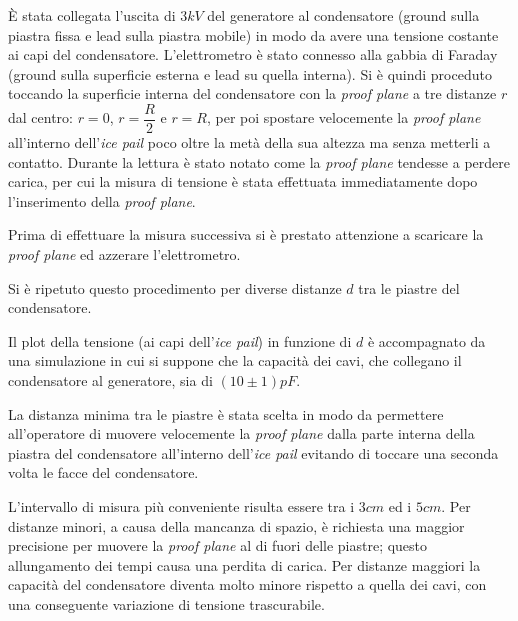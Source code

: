 {\fontsize{12}{14}\selectfont 

È stata collegata l'uscita di $3kV$ del generatore al condensatore (ground sulla piastra fissa e lead sulla piastra mobile) in modo da avere una tensione costante ai capi del condensatore. L'elettrometro è stato connesso alla gabbia di Faraday (ground sulla superficie esterna e lead su quella interna). Si è quindi proceduto toccando la superficie interna del condensatore con la \emph{proof plane} a tre distanze $r$ dal centro: $r = 0$, $r = \dfrac{R}{2}$ e $r = R$, per poi spostare velocemente la \emph{proof plane} all'interno dell'\emph{ice pail} poco oltre la metà della sua altezza ma senza metterli a contatto. Durante la lettura è stato notato come la \emph{proof plane} tendesse a perdere carica, per cui la misura di tensione è stata effettuata immediatamente dopo l'inserimento della \emph{proof plane}.
\par
Prima di effettuare la misura successiva si è prestato attenzione a scaricare la \emph{proof plane} ed azzerare l'elettrometro.
\par
Si è ripetuto questo procedimento per diverse distanze $d$ tra le piastre del condensatore.
\par
Il plot della tensione (ai capi dell'\emph{ice pail}) in funzione di $d$ è accompagnato da una simulazione in cui si suppone che la capacità dei cavi, che collegano il condensatore al generatore, sia di $(10 \pm 1)pF$.

La distanza minima tra le piastre è stata scelta in modo da permettere all'operatore di muovere velocemente la \emph{proof plane} dalla parte interna della piastra del condensatore all'interno dell'\emph{ice pail} evitando di toccare una seconda volta le facce del condensatore. 
\par
L'intervallo di misura più conveniente risulta essere tra i $3cm$ ed i $5cm$. Per distanze minori, a causa della mancanza di spazio, è richiesta una maggior precisione per muovere la \emph{proof plane} al di fuori delle piastre; questo allungamento dei tempi causa una perdita di carica. Per distanze maggiori la capacità del condensatore diventa molto minore rispetto a quella dei cavi, con una conseguente variazione di tensione trascurabile.
\par}